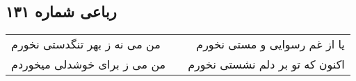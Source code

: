 \begin{center}
\section*{رباعی شماره ۱۳۱}
\label{sec:sh131}
\begin{longtable}{l p{0.5cm} r}
من می نه ز بهر تنگدستی نخورم
&&
یا از غم رسوایی و مستی نخورم
\\
من می ز برای خوشدلی میخوردم
&&
اکنون که تو بر دلم نشستی نخورم
\\
\end{longtable}
\end{center}

